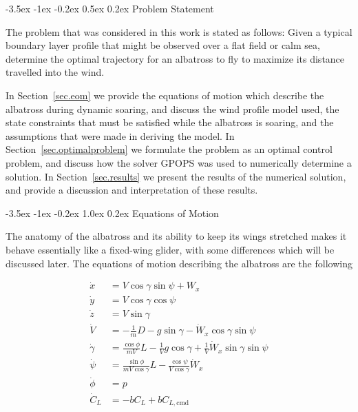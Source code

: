 \documentclass[11pt,letterpaper,onecolumn]{article}
\makeatletter
\renewcommand\section{\@startsection{section}{1}{\z@}%
 {-3.5ex \@plus-1ex \@minus-0.2ex}%
 {1.0ex \@plus0.2ex}%
 {\fontsize{12pt}{12pt}\selectfont\bfseries\sffamily}}
\renewcommand\subsection{\@startsection{subsection}{1}{\z@}%
 {-3.5ex \@plus-1ex \@minus-0.2ex}%
 {0.5ex \@plus0.2ex}%
 {\fontsize{10pt}{10pt}\selectfont\bfseries\sffamily}}
\makeatother
\begin{document}
\subsection{Problem Statement}\label{sec.problemstatement}

The problem that was considered in this work is stated as follows: Given a typical boundary layer profile that might be observed over a flat field or calm sea, determine the optimal trajectory for an albatross to fly to maximize its distance travelled into the wind.

In Section~\ref{sec.eom} we provide the equations of motion which describe the albatross during dynamic soaring, and discuss the wind profile model used, the state constraints that must be satisfied while the albatross is soaring, and the assumptions that were made in deriving the model.
In Section~\ref{sec.optimalproblem} we formulate the problem as an optimal control problem, and discuss how the solver GPOPS was used to numerically determine a solution.
In Section~\ref{sec.results} we present the results of the numerical solution, and provide a discussion and interpretation of these results.

\section{Equations of Motion}\label{sec.eom}

The anatomy of the albatross and its ability to keep its wings stretched makes it behave essentially like a fixed-wing glider, with some differences which will be discussed later.
The equations of motion describing the albatross are the following\cite{zhao.optimalpatterns.2004}

\begin{equation}
  \begin{split}\label{eqn.eom}
    \dot{x}       &= V\cos\gamma\sin\psi+W_{x} \\
    \dot{y}       &= V\cos\gamma\cos\psi \\
    \dot{z}       &= V\sin\gamma \\
    \dot{V}       &= -\frac{1}{m}D-g\sin\gamma-\dot{W}_{x}\cos\gamma\sin\psi \\
    \dot{\gamma}  &= \frac{\cos\phi}{mV}L-\frac{1}{V}g\cos\gamma+\frac{1}{V}\dot{W}_{x}\sin\gamma\sin\psi \\
    \dot{\psi}    &= \frac{\sin\phi}{mV\cos\gamma}L-\frac{\cos\psi}{V\cos\gamma}\dot{W}_{x} \\
    \dot{\phi}    &= p \\
    \dot{C}_{L}   &= -bC_{L}+bC_{L,\text{cmd}}
  \end{split}
\end{equation}
\end{document}
